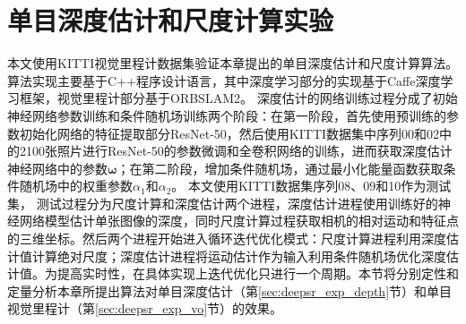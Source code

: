 \section{单目深度估计和尺度计算实验}
\label{sec:deepsr_experiment}
本文使用KITTI视觉里程计数据集\cite{geiger2012kitti}验证本章提出的单目深度估计和尺度计算算法。算法实现主要基于C++程序设计语言，其中深度学习部分的实现基于Caffe深度学习框架\cite{jia2014caffe}，视觉里程计部分基于ORBSLAM2\cite{mur2017orb}。
深度估计的网络训练过程分成了初始神经网络参数训练和条件随机场训练两个阶段：在第一阶段，首先使用预训练的参数初始化网络的特征提取部分ResNet-50，然后使用KITTI数据集中序列00和02中的2100张照片进行ResNet-50的参数微调和全卷积网络的训练，进而获取深度估计神经网络中的参数$\mathbf{\omega}$；在第二阶段，增加条件随机场，通过最小化能量函数获取条件随机场中的权重参数$\alpha_1$和$\alpha_2$。
本文使用KITTI数据集序列08、09和10作为测试集，
测试过程分为尺度计算和深度估计两个进程，深度估计进程使用训练好的神经网络模型估计单张图像的深度，同时尺度计算过程获取相机的相对运动和特征点的三维坐标。然后两个进程开始进入循环迭代优化模式：尺度计算进程利用深度估计值计算绝对尺度；深度估计进程将运动估计作为输入利用条件随机场优化深度估计值。为提高实时性，在具体实现上迭代优化只进行一个周期。本节将分别定性和定量分析本章所提出算法对单目深度估计（第\ref{sec:deepsr_exp_depth}节）和单目视觉里程计（第\ref{sec:deepsr_exp_vo}节）的效果。

